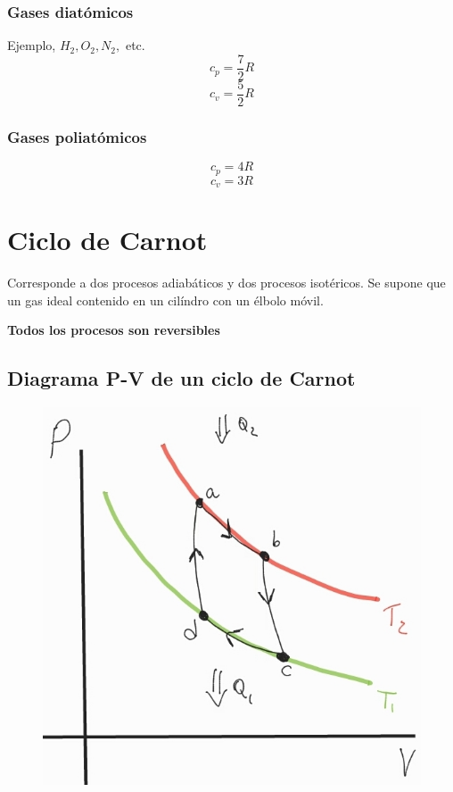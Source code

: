 \documentclass[12pt,twocolumn,a4paper]{report}
\begin{document}
\subsection*{Gases diatómicos}
Ejemplo, $H_2, O_2, N_2,$ etc. 
$$
c_p = \dfrac{7}{2}R
$$
$$
c_v = \dfrac{5}{2} R
$$

\subsection*{Gases poliatómicos}
$$
c_p = 4R
$$
$$
c_v = 3R
$$

\chapter*{Ciclo de Carnot}
Corresponde a dos procesos adiabáticos y dos procesos isotéricos. Se supone que un gas ideal contenido en un cilíndro con un élbolo móvil. 

\textbf{Todos los procesos son reversibles}

\section*{Diagrama P-V de un ciclo de Carnot}

\begin{figure}[H]
\centering
\includegraphics[scale=0.35]{graficos/1_04_10.jpg}
\end{figure}
\end{document}

